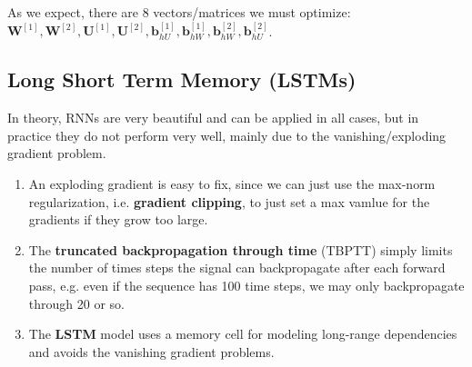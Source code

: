 \documentclass{article}
\begin{document}
\begin{figure}[H]
      \caption{}
      \label{fig:rnn_pytorch_rnn}
    \end{figure}

    As we expect, there are 8 vectors/matrices we must optimize: $\mathbf{W}^{[1]}, \mathbf{W}^{[2]}, \mathbf{U}^{[1]}, \mathbf{U}^{[2]}, \mathbf{b}^{[1]}_{hU}, \mathbf{b}^{[1]}_{hW}, \mathbf{b}^{[2]}_{hW}, \mathbf{b}^{[2]}_{hU}$. 

\subsection{Long Short Term Memory (LSTMs)}

  In theory, RNNs are very beautiful and can be applied in all cases, but in practice they do not perform very well, mainly due to the vanishing/exploding gradient problem. 
  \begin{enumerate}
    \item An exploding gradient is easy to fix, since we can just use the max-norm regularization, i.e. \textbf{gradient clipping}, to just set a max vamlue for the gradients if they grow too large. 
    \item The \textbf{truncated backpropagation through time} (TBPTT) simply limits the number of times steps the signal can backpropagate after each forward pass, e.g. even if the sequence has 100 time steps, we may only backpropagate through 20 or so. 
    \item The \textbf{LSTM} model uses a memory cell for modeling long-range dependencies and avoids the vanishing gradient problems. 
  \end{enumerate}
\end{document}
